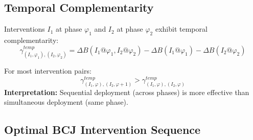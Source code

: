 \subsection{Temporal Complementarity}

\begin{definition}
Interventions $I_1$ at phase $\varphi_1$ and $I_2$ at phase $\varphi_2$ exhibit temporal complementarity:
\begin{equation}
\gamma^{temp}_{(I_1,\varphi_1),(I_2,\varphi_2)} = \Delta B(I_1@\varphi_1, I_2@\varphi_2) - \Delta B(I_1@\varphi_1) - \Delta B(I_2@\varphi_2)
\end{equation}
\end{definition}

\begin{theorem}
For most intervention pairs:
\begin{equation}
\gamma^{temp}_{(I_1,\varphi),(I_2,\varphi+1)} > \gamma^{temp}_{(I_1,\varphi),(I_2,\varphi)}
\end{equation}
\textbf{Interpretation:} Sequential deployment (across phases) is more effective than simultaneous deployment (same phase).
\end{theorem}

\subsection{Optimal BCJ Intervention Sequence}

